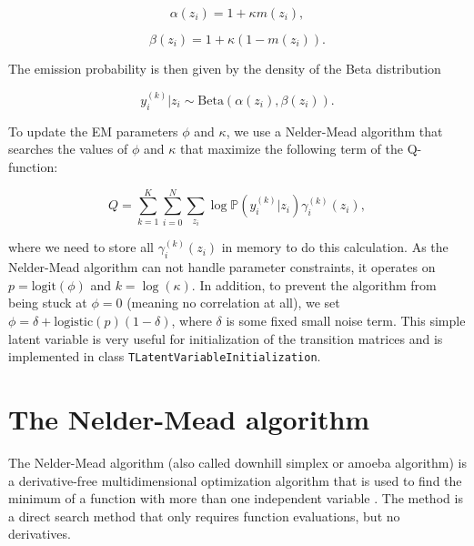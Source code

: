 \documentclass[a4paper,11pt]{article}
\def\logit{\mbox{logit}}
\def\logistic{\mbox{logistic}}
\def\p{\mathbb{P}}
\newcommand{\class}[1]{\texttt{#1}}
\begin{document}
\begin{equation*}
 \alpha(z_i) = 1 + \kappa m(z_i),
\end{equation*}

\begin{equation*}
 \beta(z_i) = 1 + \kappa (1 - m(z_i)).
\end{equation*}

The emission probability is then given by the density of the Beta distribution

\begin{equation*}
 y_{i}^{(k)} | z_i \sim \mbox{Beta}(\alpha(z_i), \beta(z_i)).
\end{equation*}

To update the EM parameters $\phi$ and $\kappa$, we use a Nelder-Mead algorithm that searches the values of $\phi$ and $\kappa$ that maximize the following term of the Q-function:

\begin{equation*}
 Q = \sum_{k=1}^K \sum_{i=0}^N \sum_{z_i} \log \p(y_{i}^{(k)} | z_i) \gamma_i^{(k)}(z_i),
\end{equation*}

where we need to store all $\gamma_i^{(k)}(z_i)$ in memory to do this calculation. As the Nelder-Mead algorithm can not handle parameter constraints, it operates on $p = \logit(\phi)$ and $k = \log(\kappa)$. In addition, to prevent the algorithm from being stuck at $\phi = 0$ (meaning no correlation at all), we set $\phi = \delta + \logistic(p) (1 - \delta)$, where $\delta$ is some fixed small noise term.
This simple latent variable is very useful for initialization of the transition matrices and is implemented in class \class{TLatentVariableInitialization}.

\section{The Nelder-Mead algorithm}\label{section:NelderMeadAlgo}

The Nelder-Mead algorithm (also called downhill simplex or amoeba algorithm) is a derivative-free multidimensional optimization algorithm that is used to find the minimum of a function with more than one independent variable \citep{Nelder1965, Press2007}. The method is a direct search method that only requires function evaluations, but no derivatives.
\end{document}
